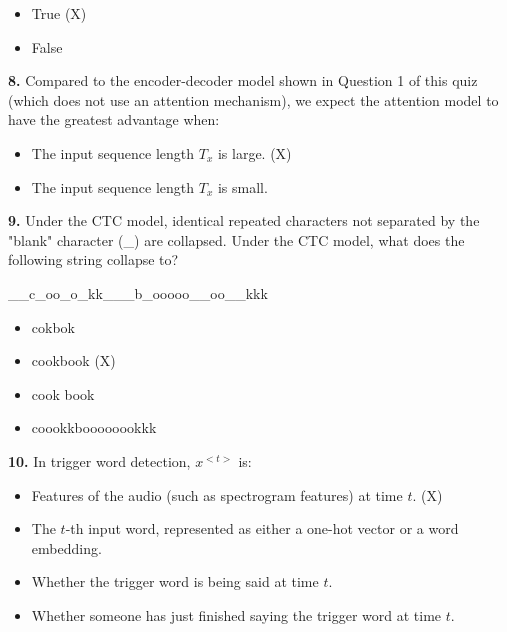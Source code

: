 \begin{itemize}
    \item True (X)
    \item False
\end{itemize}
\textbf{8.} Compared to the encoder-decoder model shown in Question 1 of this quiz (which does not use an attention mechanism), we expect the attention model to have the greatest advantage when:
\begin{itemize}
    \item The input sequence length $T_x$ is large. (X)
    \item The input sequence length $T_x$ is small.
\end{itemize}
\textbf{9.} Under the CTC model, identical repeated characters not separated by the "blank" character (\_) are collapsed. Under the CTC model, what does the following string collapse to?

\_\_c\_oo\_o\_kk\_\_\_b\_ooooo\_\_oo\_\_kkk
\begin{itemize}
    \item cokbok
    \item cookbook (X)
    \item cook book
    \item coookkboooooookkk
\end{itemize}
\textbf{10.} In trigger word detection, $x^{<t>}$ is:
\begin{itemize}
    \item Features of the audio (such as spectrogram features) at time $t$. (X)
    \item The $t$-th input word, represented as either a one-hot vector or a word embedding.
    \item Whether the trigger word is being said at time $t$.
    \item Whether someone has just finished saying the trigger word at time $t$.
\end{itemize}